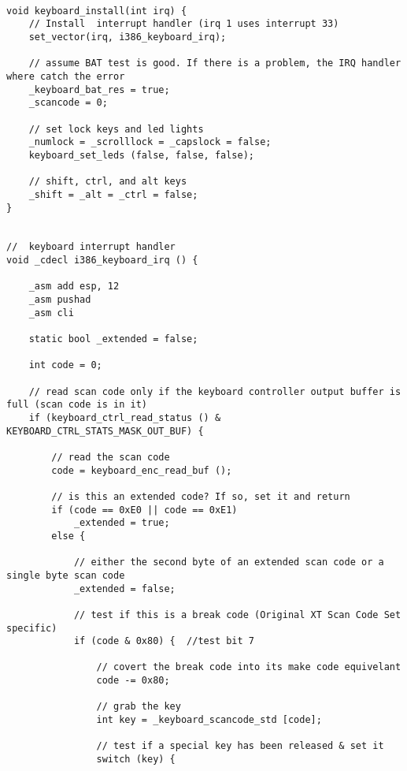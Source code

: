 \documentclass[document.tex]{subfiles}
\begin{document}
\begin{english}

\lstset{numberstyle=\tiny,numbers=left,stepnumber=1,numbersep=5pt,tabsize=2,extendedchars=true,breaklines=true,frame=b,showspaces=false, showtabs=false,xleftmargin=10pt,framexleftmargin=10pt,framexrightmargin=5pt,framexbottommargin=4pt,showstringspaces=false,language=C++}

\begin{lstlisting}[label=keyboard.cpp,caption=\en{Keybaord Driver Implemetation}]

void keyboard_install(int irq) {
	// Install  interrupt handler (irq 1 uses interrupt 33)
	set_vector(irq, i386_keyboard_irq);

	// assume BAT test is good. If there is a problem, the IRQ handler where catch the error
	_keyboard_bat_res = true;
	_scancode = 0;

	// set lock keys and led lights
	_numlock = _scrolllock = _capslock = false;
	keyboard_set_leds (false, false, false);

	// shift, ctrl, and alt keys
	_shift = _alt = _ctrl = false;
}


//	keyboard interrupt handler
void _cdecl i386_keyboard_irq () {

	_asm add esp, 12
	_asm pushad
	_asm cli

	static bool _extended = false;

	int code = 0;

	// read scan code only if the keyboard controller output buffer is full (scan code is in it)
	if (keyboard_ctrl_read_status () & KEYBOARD_CTRL_STATS_MASK_OUT_BUF) {

		// read the scan code
		code = keyboard_enc_read_buf ();

		// is this an extended code? If so, set it and return
		if (code == 0xE0 || code == 0xE1)
			_extended = true;
		else {

			// either the second byte of an extended scan code or a single byte scan code
			_extended = false;

			// test if this is a break code (Original XT Scan Code Set specific)
			if (code & 0x80) {	//test bit 7

				// covert the break code into its make code equivelant
				code -= 0x80;

				// grab the key
				int key = _keyboard_scancode_std [code];

				// test if a special key has been released & set it
				switch (key) {


\end{lstlisting}
\end{english}
\end{document}
